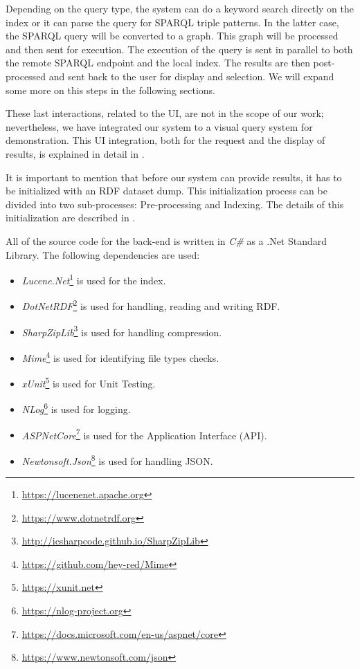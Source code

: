 Depending on the query type, the system can do a keyword search directly on the index or it can parse the query for SPARQL triple patterns. 
In the latter case, the SPARQL query will be converted to a graph. 
This graph will be processed and then sent for execution. 
The execution of the query is sent in parallel to both the remote SPARQL endpoint and the local index. 
The results are then post-processed and sent back to the user for display and selection. 
We will expand some more on this steps in the following sections.

These last interactions, related to the UI, are not in the scope of our work; nevertheless, we have integrated our system to a visual query system for demonstration. 
This UI integration, both for the request and the display of results, is explained in detail in .

It is important to mention that before our system can provide results, it has to be initialized with an RDF dataset dump. 
This initialization process can be divided into two sub-processes: 
Pre-processing and Indexing. 
The details of this initialization are described in . 

All of the source code for the back-end is written in \textit{C\#} as a .Net Standard Library. 
The following dependencies are used:

\begin{itemize}
    \item \textit{Lucene.Net}\footnote{\url{https://lucenenet.apache.org}} is used for the index. 
    \item \textit{DotNetRDF}\footnote{\url{https://www.dotnetrdf.org}} is used for handling, reading and writing RDF.
    \item \textit{SharpZipLib}\footnote{\url{http://icsharpcode.github.io/SharpZipLib}} is used for handling compression.
    \item \textit{Mime}\footnote{\url{https://github.com/hey-red/Mime}} is used for identifying file types checks.
    \item \textit{xUnit}\footnote{\url{https://xunit.net}} is used for Unit Testing.
    \item \textit{NLog}\footnote{\url{https://nlog-project.org}} is used for logging.
    \item \textit{ASPNetCore}\footnote{\url{https://docs.microsoft.com/en-us/aspnet/core}} is used for the Application Interface (API).
    \item \textit{Newtonsoft.Json}\footnote{\url{https://www.newtonsoft.com/json}} is used for handling JSON.
\end{itemize}

